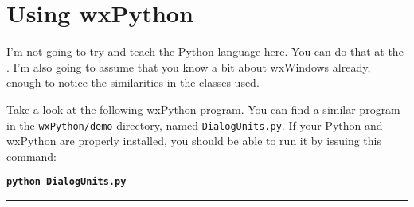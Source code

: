 \section{Using wxPython}\label{wxpusing}


I'm not going to try and teach the Python language here. You can do
that at the .
I'm also going to assume that you know a bit about wxWindows already,
enough to notice the similarities in the classes used.

Take a look at the following wxPython program. You can find a similar
program in the {\tt wxPython/demo} directory, named {\tt DialogUnits.py}. If your
Python and wxPython are properly installed, you should be able to run
it by issuing this command:

\begin{indented}{1cm}
    {\bf\tt python DialogUnits.py}
\end{indented}

\hrule

